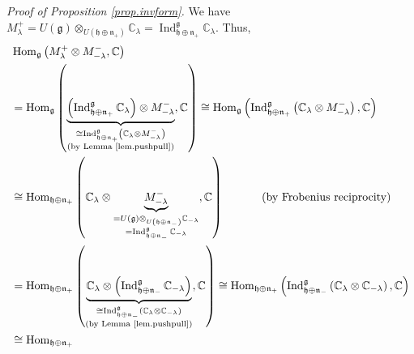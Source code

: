 \documentclass[etingof-lie.tex]{subfiles}
\begin{document}
\textit{Proof of Proposition \ref{prop.invform}.} We have $M_{\lambda}%
^{+}=U\left(  \mathfrak{g}\right)  \otimes_{U\left(  \mathfrak{h}%
\oplus\mathfrak{n}_{+}\right)  }\mathbb{C}_{\lambda}=\operatorname*{Ind}%
\nolimits_{\mathfrak{h}\oplus\mathfrak{n}_{+}}^{\mathfrak{g}}\mathbb{C}%
_{\lambda}$. Thus,%
\begin{align*}
&  \operatorname*{Hom}\nolimits_{\mathfrak{g}}\left(  M_{\lambda}^{+}\otimes
M_{-\lambda}^{-},\mathbb{C}\right) \\
&  =\operatorname*{Hom}\nolimits_{\mathfrak{g}}\left(  \underbrace{\left(
\operatorname*{Ind}\nolimits_{\mathfrak{h}\oplus\mathfrak{n}_{+}%
}^{\mathfrak{g}}\mathbb{C}_{\lambda}\right)  \otimes M_{-\lambda}^{-}%
}_{\substack{\cong\operatorname*{Ind}\nolimits_{\mathfrak{h}\oplus
\mathfrak{n}_{+}}^{\mathfrak{g}}\left(  \mathbb{C}_{\lambda}\otimes
M_{-\lambda}^{-}\right)  \\\text{(by Lemma \ref{lem.pushpull})}}%
},\mathbb{C}\right)  \cong\operatorname*{Hom}\nolimits_{\mathfrak{g}}\left(
\operatorname*{Ind}\nolimits_{\mathfrak{h}\oplus\mathfrak{n}_{+}%
}^{\mathfrak{g}}\left(  \mathbb{C}_{\lambda}\otimes M_{-\lambda}^{-}\right)
,\mathbb{C}\right) \\
&  \cong\operatorname*{Hom}\nolimits_{\mathfrak{h}\oplus\mathfrak{n}_{+}%
}\left(  \mathbb{C}_{\lambda}\otimes\underbrace{M_{-\lambda}^{-}%
}_{\substack{=U\left(  \mathfrak{g}\right)  \otimes_{U\left(  \mathfrak{h}%
\oplus\mathfrak{n}_{-}\right)  }\mathbb{C}_{-\lambda}\\=\operatorname*{Ind}%
\nolimits_{\mathfrak{h}\oplus\mathfrak{n}_{-}}^{\mathfrak{g}}\mathbb{C}%
_{-\lambda}}},\mathbb{C}\right)  \ \ \ \ \ \ \ \ \ \ \left(  \text{by
Frobenius reciprocity}\right) \\
&  =\operatorname*{Hom}\nolimits_{\mathfrak{h}\oplus\mathfrak{n}_{+}}\left(
\underbrace{\mathbb{C}_{\lambda}\otimes\left(  \operatorname*{Ind}%
\nolimits_{\mathfrak{h}\oplus\mathfrak{n}_{-}}^{\mathfrak{g}}\mathbb{C}%
_{-\lambda}\right)  }_{\substack{\cong\operatorname*{Ind}%
\nolimits_{\mathfrak{h}\oplus\mathfrak{n}_{-}}^{\mathfrak{g}}\left(
\mathbb{C}_{\lambda}\otimes\mathbb{C}_{-\lambda}\right)  \\\text{(by Lemma
\ref{lem.pushpull})}}},\mathbb{C}\right)  \cong\operatorname*{Hom}%
\nolimits_{\mathfrak{h}\oplus\mathfrak{n}_{+}}\left(  \operatorname*{Ind}%
\nolimits_{\mathfrak{h}\oplus\mathfrak{n}_{-}}^{\mathfrak{g}}\left(
\mathbb{C}_{\lambda}\otimes\mathbb{C}_{-\lambda}\right)  ,\mathbb{C}\right) \\
&  \cong\operatorname*{Hom}\nolimits_{\mathfrak{h}\oplus\mathfrak{n}_{+}%
}
\end{align*}
\end{document}
